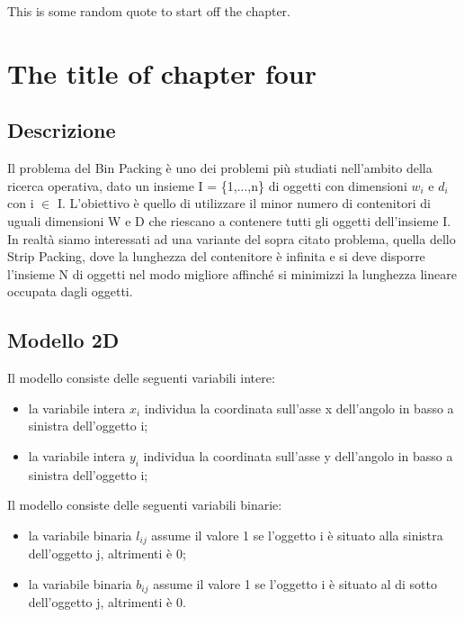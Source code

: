 \begin{savequote}[75mm]
This is some random quote to start off the chapter.
\end{savequote}

\chapter{The title of chapter four}
\label{chap:four}

\section{Descrizione}
Il problema del Bin Packing è uno dei problemi più studiati nell'ambito della ricerca operativa, dato un insieme I = \{1,...,n\} di oggetti con dimensioni $w_{i}$ e $d_{i}$ con i $\in$ I.
L'obiettivo è quello di utilizzare il minor numero di contenitori di uguali dimensioni W e D che riescano a contenere tutti gli oggetti dell'insieme I.
\newline
In realtà siamo interessati ad una variante del sopra citato problema, quella dello Strip Packing, dove la lunghezza del contenitore è infinita e si deve disporre l'insieme N di oggetti nel modo migliore affinché si minimizzi la lunghezza lineare occupata dagli oggetti.
\newpage
\section{Modello 2D}
Il modello consiste delle seguenti variabili intere:
\begin{itemize}
    \item la variabile intera $x_{i}$ individua la coordinata sull'asse x dell'angolo in basso a sinistra dell'oggetto i;
    \item la variabile intera $y_{i}$ individua la coordinata sull'asse y dell'angolo in basso a sinistra dell'oggetto i;
\end{itemize}
Il modello consiste delle seguenti variabili binarie:
\begin{itemize}
    \item la variabile binaria $l_{ij}$ assume il valore 1 se l'oggetto i è situato alla sinistra dell'oggetto j, altrimenti è 0;
    \item la variabile binaria $b_{ij}$ assume il valore 1 se l'oggetto i è situato al di sotto dell'oggetto j, altrimenti è 0.
\end{itemize}


